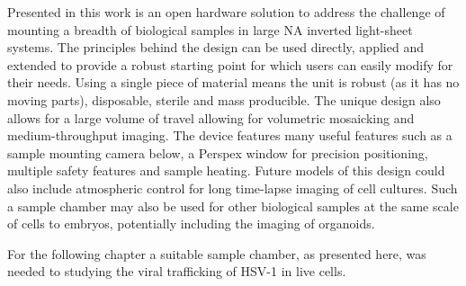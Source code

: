 Presented in this work is an open hardware solution to address the challenge of mounting a breadth of biological samples in large \gls{NA} inverted light-sheet systems.
The principles behind the design can be used directly, applied and extended to provide a robust starting point for which users can easily modify for their needs.
Using a single piece of  material means the unit is robust (as it has no moving parts), disposable, sterile and mass producible.
The unique design also allows for a large volume of travel allowing for volumetric mosaicking and medium-throughput imaging.
The device features many useful features such as a sample mounting camera below, a Perspex window for precision positioning, multiple safety features and sample heating.
Future models of this design could also include atmospheric control for long time-lapse imaging of cell cultures.
Such a sample chamber may also be used for other biological samples at the same scale of cells to embryos, potentially including the imaging of \gls{organoid}s.

For the following chapter a suitable sample chamber, as presented here, was needed to studying the viral trafficking of \gls{HSV}-1 in live cells.
%


